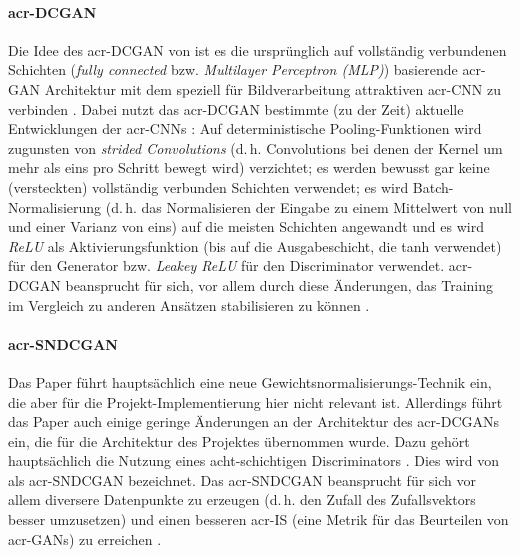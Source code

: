 \paragraph{\gls{acr-DCGAN}} Die Idee des \gls{acr-DCGAN} von
\citeauthor{radford2015unsupervised} \cite{radford2015unsupervised} ist es die
ursprünglich \cite[vgl.][]{goodfellow2014generative} auf vollständig verbundenen
Schichten (\emph{fully connected} bzw. \emph{Multilayer Perceptron (MLP)})
basierende \gls{acr-GAN} Architektur mit dem speziell für Bildverarbeitung
attraktiven \gls{acr-CNN} zu verbinden \cite[S. 1]{radford2015unsupervised}.
Dabei nutzt das \gls{acr-DCGAN} bestimmte (zu der Zeit) aktuelle Entwicklungen
der \gls{acr-CNN}s \cite[vgl.][S. 3]{radford2015unsupervised}: Auf deterministische Pooling-Funktionen wird zugunsten von
\emph{strided Convolutions} (d.\,h. Convolutions bei denen der Kernel um mehr als eins pro
Schritt bewegt wird) verzichtet; es werden bewusst gar keine (versteckten)
vollständig verbunden Schichten verwendet; es wird Batch-Normalisierung (d.\,h.
das Normalisieren der Eingabe zu einem Mittelwert von null und einer Varianz von
eins) auf die meisten Schichten angewandt und es wird \emph{ReLU} als
Aktivierungsfunktion (bis auf die Ausgabeschicht, die tanh verwendet) für den
Generator bzw. 
\emph{Leakey ReLU} für den Discriminator verwendet.
\gls{acr-DCGAN} beansprucht für sich, vor allem durch diese Änderungen, das
Training im Vergleich zu anderen Ansätzen stabilisieren zu können \cite[S.
9]{radford2015unsupervised}.

\paragraph{\gls{acr-SNDCGAN}} Das Paper 
\cite{miyato2018spectral} führt hauptsächlich eine neue
Gewichtsnormalisierungs-Technik ein, die aber für die Pro\-jekt-Imp\-le\-men\-tier\-ung
hier nicht relevant ist. Allerdings führt das Paper auch einige geringe
Änderungen an der Architektur des \gls{acr-DCGAN}s ein, die für die Architektur
des Projektes übernommen wurde. Dazu gehört hauptsächlich die Nutzung eines
acht-schichtigen Discriminators \cite[S. 3]{kurach2018gan}. Dies wird von
\citeauthor{kurach2018gan} \cite{kurach2018gan} als \gls{acr-SNDCGAN}
bezeichnet. Das \gls{acr-SNDCGAN} beansprucht für sich vor allem diversere
Datenpunkte zu erzeugen (d.\,h. den Zufall des Zufallsvektors besser umzusetzen)
und einen besseren \gls{acr-IS} (eine Metrik für das Beurteilen von
\gls{acr-GAN}s) zu erreichen \cite[S. 11]{miyato2018spectral}.

